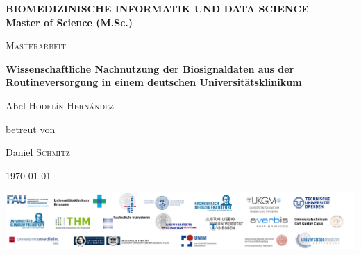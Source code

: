 \begin{titlepage}
	\thispagestyle{firstpage}
	\raggedright
	{
		{\normalsize \color{orange} \bfseries BIOMEDIZINISCHE INFORMATIK UND DATA SCIENCE  \\}
		{\normalsize \color{gray} \bfseries Master of Science (M.Sc.)}
		\par
	}
	
	\vspace{1cm}
	
	\centering
	{\scshape\LARGE Masterarbeit \par}
	
	\vspace{1.5cm}
	{\huge \bfseries Wissenschaftliche Nachnutzung der Biosignaldaten aus der Routineversorgung in einem deutschen Universitätsklinikum \par}
	
	\vspace{2cm}
	{\Large Abel \textsc{Hodel\'in Hern\'andez}~\par}
	\vspace{2cm} 
	betreut von\par
	{Daniel \textsc{Schmitz}\par}

	\vspace{2cm}

	{\large \today\par}
	
	\vfill
	
	\includegraphics[width=\textwidth]{figures/onder_document}
	
\end{titlepage}
